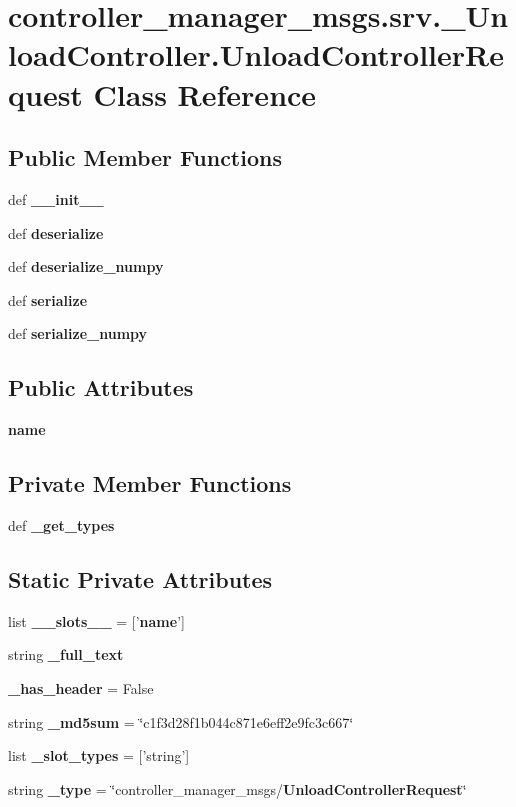 \section{controller\-\_\-manager\-\_\-msgs.\-srv.\-\_\-\-Unload\-Controller.\-Unload\-Controller\-Request \-Class \-Reference}
\label{classcontroller__manager__msgs_1_1srv_1_1__UnloadController_1_1UnloadControllerRequest}
\subsection*{\-Public \-Member \-Functions}
\begin{DoxyCompactItemize}
\item 
def {\bf \-\_\-\-\_\-init\-\_\-\-\_\-}
\item 
def {\bf deserialize}
\item 
def {\bf deserialize\-\_\-numpy}
\item 
def {\bf serialize}
\item 
def {\bf serialize\-\_\-numpy}
\end{DoxyCompactItemize}
\subsection*{\-Public \-Attributes}
\begin{DoxyCompactItemize}
\item 
{\bf name}
\end{DoxyCompactItemize}
\subsection*{\-Private \-Member \-Functions}
\begin{DoxyCompactItemize}
\item 
def {\bf \-\_\-get\-\_\-types}
\end{DoxyCompactItemize}
\subsection*{\-Static \-Private \-Attributes}
\begin{DoxyCompactItemize}
\item 
list {\bf \-\_\-\-\_\-slots\-\_\-\-\_\-} = ['{\bf name}']
\item 
string {\bf \-\_\-full\-\_\-text}
\item 
{\bf \-\_\-has\-\_\-header} = \-False
\item 
string {\bf \-\_\-md5sum} = \char`\"{}c1f3d28f1b044c871e6eff2e9fc3c667\char`\"{}
\item 
list {\bf \-\_\-slot\-\_\-types} = ['string']
\item 
string {\bf \-\_\-type} = \char`\"{}controller\-\_\-manager\-\_\-msgs/{\bf \-Unload\-Controller\-Request}\char`\"{}
\end{DoxyCompactItemize}


